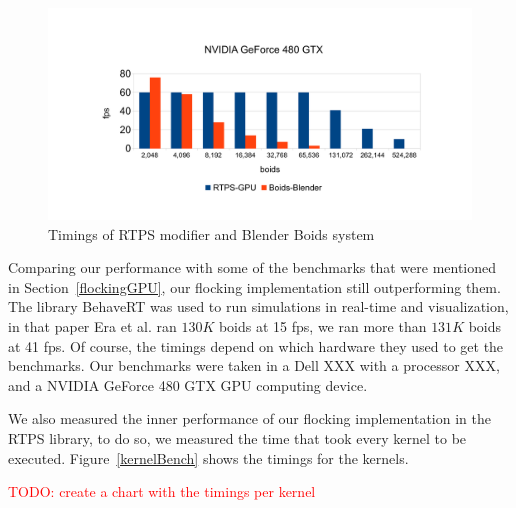 \begin{figure}[htbp]
\begin{center}
\includegraphics[scale=0.45]{figures/benchmarks.pdf}
\caption{Timings of RTPS modifier and Blender Boids system}
\label{plot}
\end{center}
\end{figure}

Comparing our performance with some of the benchmarks that were mentioned in Section~\ref{flockingGPU}, our flocking implementation still outperforming them. The library BehaveRT was used to run simulations in real-time and visualization, in that paper Era et al. ran $130K$ boids at 15 fps, we ran more than $131K$ boids at 41 fps. Of course, the timings depend on which hardware they used to get the benchmarks. Our benchmarks were taken in a Dell XXX with a processor XXX, and a NVIDIA GeForce 480 GTX GPU computing device. 

We also measured the inner performance of our flocking implementation in the RTPS library, to do so, we measured the time that took every kernel to be executed. Figure~\ref{kernelBench} shows the timings for the kernels.

\textcolor{red}{TODO: create a chart with the timings per kernel}



